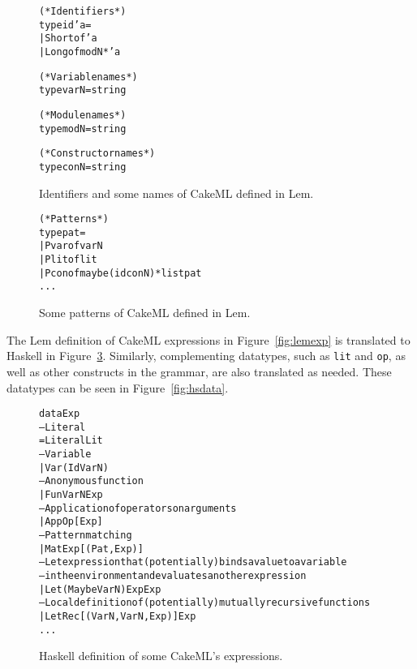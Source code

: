 \begin{figure}
\begin{alltt}
  (* Identifiers *)
  type id 'a =
    | Short of 'a
    | Long of modN * 'a


  (* Variable names *)
  type varN = string

  (* Module names *)
  type modN = string

  (* Constructor names *)
  type conN = string

\end{alltt}
\caption{Identifiers and some names of CakeML defined in Lem.}
\label{fig:lemid}
\end{figure}

\begin{figure}
\begin{alltt}
  (* Patterns *)
  type pat =
    | Pvar of varN
    | Plit of lit
    | Pcon of maybe (id conN) * list pat
    ...
\end{alltt}
\caption{Some patterns of CakeML defined in Lem.}
\label{fig:lempat}
\end{figure}

The Lem definition of CakeML expressions in Figure~\ref{fig:lemexp} is
translated to Haskell in Figure~\ref{fig:hsexp}.
Similarly, complementing datatypes, such as \texttt{lit} and
\texttt{op}, as well as other constructs in the grammar, are also translated
as needed. These datatypes can be seen in Figure~\ref{fig:hsdata}.

\begin{figure}
\begin{alltt}
  data Exp
    -- Literal
    = Literal Lit
    -- Variable
    | Var (Id VarN)
    -- Anonymous function
    | Fun VarN Exp
    -- Application of operators on arguments
    | App Op [Exp]
    -- Pattern matching
    | Mat Exp [(Pat, Exp)]
    -- Let expression that (potentially) binds a value to a variable
    -- in the environment and evaluates another expression
    | Let (Maybe VarN) Exp Exp
    -- Local definition of (potentially) mutually recursive functions
    | LetRec [(VarN, VarN, Exp)] Exp
    ...
\end{alltt}
\caption{Haskell definition of some CakeML's expressions.}
\label{fig:hsexp}
\end{figure}

